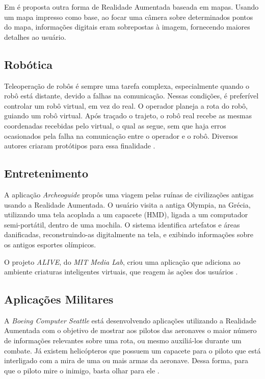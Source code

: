 Em \cite{AugmentedMaps} é proposta outra forma de Realidade Aumentada
baseada em mapas. Usando um mapa impresso como base, ao focar uma câmera sobre determinados
pontos do mapa, informações digitais eram sobrepostas à imagem, fornecendo maiores detalhes
ao usuário.



\subsection{Robótica}

Teleoperação de robôs é sempre uma tarefa complexa, especialmente quando o robô está distante, devido a falhas
na comunicação. Nessas condições, é preferível controlar um robô virtual, em vez do real. O operador planeja a 
rota do robô, guiando um robô virtual. Após traçado o trajeto, o robô real recebe as mesmas coordenadas recebidas
pelo virtual, o qual as segue, sem que haja erros ocasionados pela falha na comunicação entre o operador e o 
robô. Diversos autores criaram protótipos para essa finalidade \cite{RobotAR1,RobotAR2,RobotAR3}.


\subsection{Entretenimento}

A aplicação \textit{Archeoguide} \cite{Archeoguide} propôs uma viagem pelas ruínas de civilizações antigas usando
a Realidade Aumentada. O usuário visita a antiga Olympia, na Grécia, utilizando uma tela acoplada a um capacete
(\gls{HMD}), ligada a um computador semi-portátil, dentro de uma mochila. O sistema identifica 
artefatos e áreas danificadas, reconstruindo-as digitalmente na tela, e exibindo informações sobre os antigos 
esportes olímpicos. 

O projeto \textit{ALIVE}, do \textit{MIT Media Lab}, criou uma aplicação que adiciona ao ambiente
criaturas inteligentes virtuais, que reagem às ações dos usuários \cite{ArtificialLife}.





\subsection{Aplicações Militares}


A \textit{Boeing Computer Seattle} está desenvolvendo aplicações utilizando a Realidade Aumentada com o objetivo
de mostrar aos pilotos das aeronaves o maior número de informações relevantes sobre uma rota, ou mesmo auxiliá-los 
durante um combate. Já existem helicópteros que possuem um capacete para o piloto que está interligado com a mira 
de uma ou mais armas da aeronave. Dessa forma, para que o piloto mire o inimigo, basta olhar para ele \cite{ARCADE}.











